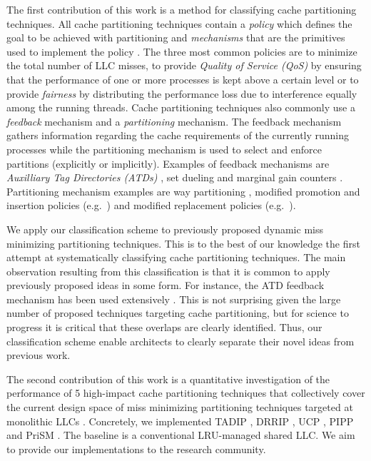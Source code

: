 The first contribution of this work is a method for classifying cache partitioning techniques.
All cache partitioning techniques contain a \textit{policy} which defines the goal to be achieved with partitioning and \textit{mechanisms} that are the primitives used to implement the policy \cite{virtualPrivateMachines}.
The three most common policies are to minimize the total number of LLC misses, to provide \textit{Quality of Service (QoS)} by ensuring that the performance of one or more processes is kept above a certain level or to provide \textit{fairness} by distributing the performance loss due to interference equally among the running threads.
Cache partitioning techniques also commonly use a \textit{feedback} mechanism and a \textit{partitioning} mechanism.
The feedback mechanism gathers information regarding the cache requirements of the currently running processes while the partitioning mechanism is used to select and enforce partitions (explicitly or implicitly).
Examples of feedback mechanisms are \textit{Auxilliary Tag Directories (ATDs)} \cite{utilityBasedCachePartitioning,haakonHiPC}, set dueling \cite{jaleel10} and marginal gain counters \cite{dynPartofSharedCacheMemory,suh02}.
Partitioning mechanism examples are way partitioning  \cite{utilityBasedCachePartitioning}, modified promotion and insertion policies (e.g.\ \cite{xie09}) and modified replacement policies (e.g.\ \cite{jaleel10, albericio13}).

We apply our classification scheme to previously proposed dynamic miss minimizing partitioning techniques.
This is to the best of our knowledge the first attempt at systematically classifying cache partitioning techniques.
The main observation resulting from this classification is that it is common to apply previously proposed ideas in some form.
For instance, the ATD feedback mechanism has been used extensively \cite{utilityBasedCachePartitioning,haakonHiPC,xie09,xie10,sanchez11,sundararajan12,manikantan12}.
This is not surprising given the large number of proposed techniques targeting cache partitioning, but for science to progress it is critical that these overlaps are clearly identified.
Thus, our classification scheme enable architects to clearly separate their novel ideas from previous work.

The second contribution of this work is a quantitative investigation of the performance of 5 high-impact cache partitioning techniques that collectively cover the current design space of miss minimizing partitioning techniques targeted at monolithic LLCs .
Concretely, we implemented TADIP \cite{jaleel08}, DRRIP \cite{jaleel10}, UCP \cite{utilityBasedCachePartitioning}, PIPP \cite{xie09} and PriSM \cite{manikantan12}.
The baseline is a conventional LRU-managed shared LLC.
We aim to provide our implementations to the research community.

